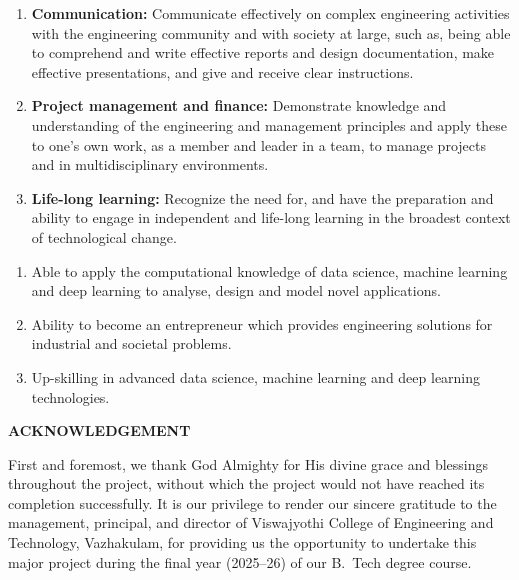 \documentclass[12pt,a4paper]{report}
\begin{document}
\begin{enumerate}[leftmargin=*, label=\arabic*.]
    \item \textbf{Communication:} Communicate effectively on complex engineering activities with the engineering community and with society at large, such as, being able to comprehend and write effective reports and design documentation, make effective presentations, and give and receive clear instructions.
    \item \textbf{Project management and finance:} Demonstrate knowledge and understanding of the engineering and management principles and apply these to one's own work, as a member and leader in a team, to manage projects and in multidisciplinary environments.
    \item \textbf{Life-long learning:} Recognize the need for, and have the preparation and ability to engage in independent and life-long learning in the broadest context of technological change.
\end{enumerate}

\vspace{0.4cm}
\par\vspace{0.2cm}
\begin{enumerate}[leftmargin=*, label=\arabic*.]
    \item Able to apply the computational knowledge of data science, machine learning and deep learning to analyse, design and model novel applications.
    \item Ability to become an entrepreneur which provides engineering solutions for industrial and societal problems.
    \item Up-skilling in advanced data science, machine learning and deep learning technologies.
\end{enumerate}
\clearpage

\clearpage
\pagestyle{empty}
\begin{center}
    {\large\bfseries ACKNOWLEDGEMENT}
\end{center}
\vspace{0.5cm}

\noindent
First and foremost, we thank God Almighty for His divine grace and blessings throughout the project, without which the project would not have reached its completion successfully. It is our privilege to render our sincere gratitude to the management, principal, and director of Viswajyothi College of Engineering and Technology, Vazhakulam, for providing us the opportunity to undertake this major project during the final year (2025--26) of our B.~Tech degree course.
\end{document}
